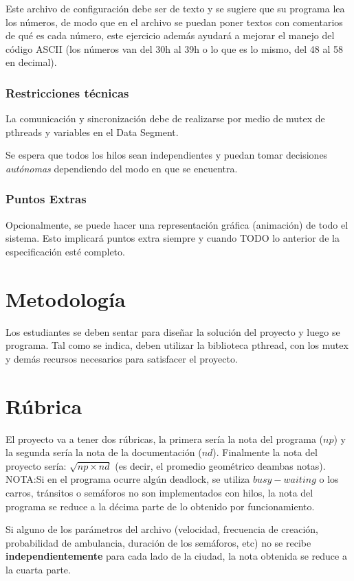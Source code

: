 \documentclass[11pt]{article}
\begin{document}
Este archivo de configuración debe ser de texto y se sugiere que su programa lea los números, de modo que en el archivo se puedan poner textos con comentarios de qué es cada número, este ejercicio además ayudará a mejorar el manejo del código ASCII (los números van del 30h al 39h o lo que es lo mismo, del 48 al 58 en decimal).


\subsubsection{Restricciones técnicas}
La comunicación y sincronización debe de realizarse por medio de mutex de pthreads y variables en el Data Segment.

Se espera que todos los hilos sean independientes y puedan tomar decisiones \textit{autónomas} dependiendo del modo en que se encuentra.

\subsubsection{Puntos Extras}

Opcionalmente, se puede hacer una representación gráfica (animación) de todo el sistema. Esto implicará puntos extra siempre y cuando TODO lo anterior de la especificación esté completo.

\section{Metodología}
Los estudiantes se deben sentar para diseñar la solución del proyecto y luego se programa. Tal como se indica, deben utilizar la biblioteca pthread, con los mutex y demás recursos necesarios para satisfacer el proyecto.

\section{Rúbrica}
El proyecto va a tener dos rúbricas, la primera sería la nota del programa ($np$) y la segunda sería la nota de la documentación ($nd$). Finalmente la nota del proyecto sería: $\sqrt{np\times nd}$ (es decir, el promedio geométrico deambas notas).\\

NOTA:Si en el programa ocurre algún deadlock, se utiliza $busy-waiting$ o los carros, tránsitos o semáforos no son implementados con hilos, la nota del programa se reduce a la décima parte de lo obtenido por funcionamiento. 

Si alguno de los parámetros del archivo (velocidad, frecuencia de creación, probabilidad de ambulancia, duración de los semáforos, etc) no se recibe \textbf{independientemente} para cada lado de la ciudad, la nota obtenida se reduce a la cuarta parte.
\end{document}

